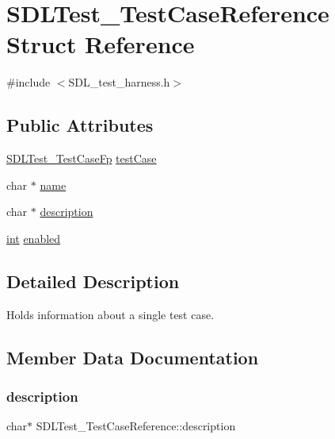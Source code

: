 \hypertarget{struct_s_d_l_test___test_case_reference}{}\section{S\+D\+L\+Test\+\_\+\+Test\+Case\+Reference Struct Reference}
\label{struct_s_d_l_test___test_case_reference}


{\ttfamily \#include $<$S\+D\+L\+\_\+test\+\_\+harness.\+h$>$}

\subsection*{Public Attributes}
\begin{DoxyCompactItemize}
\item 
\mbox{\hyperlink{_s_d_l__test__harness_8h_ae1a62d8f725d57dc95faddcc5409afbb}{S\+D\+L\+Test\+\_\+\+Test\+Case\+Fp}} \mbox{\hyperlink{struct_s_d_l_test___test_case_reference_af9472f0c421a2845b540fc28fb30a3ef}{test\+Case}}
\item 
char $\ast$ \mbox{\hyperlink{struct_s_d_l_test___test_case_reference_aabd588c915c52fb13bcd0c71e071a604}{name}}
\item 
char $\ast$ \mbox{\hyperlink{struct_s_d_l_test___test_case_reference_a1ee6c8a2529fdfcd62bb1483c26be67d}{description}}
\item 
\mbox{\hyperlink{warnings_8h_a74f207b5aa4ba51c3a2ad59b219a423b}{int}} \mbox{\hyperlink{struct_s_d_l_test___test_case_reference_a15168c85e38cae7557b4beb477ef6f9a}{enabled}}
\end{DoxyCompactItemize}


\subsection{Detailed Description}
Holds information about a single test case. 

\subsection{Member Data Documentation}
\mbox{\label{struct_s_d_l_test___test_case_reference_a1ee6c8a2529fdfcd62bb1483c26be67d}} 
\subsubsection{\texorpdfstring{description}{description}}
{\footnotesize\ttfamily char$\ast$ S\+D\+L\+Test\+\_\+\+Test\+Case\+Reference\+::description}


